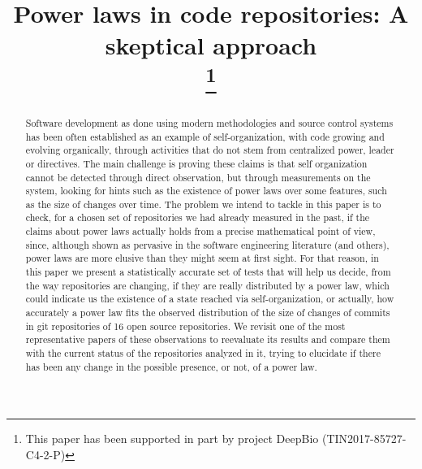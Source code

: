 \documentclass[conference]{IEEEtran}
\begin{document}
\title{Power laws in code repositories: A skeptical approach\\
  \thanks{This paper has been supported in part by project DeepBio
    (TIN2017-85727-C4-2-P)} }

\author{
   \and {}
   }

\maketitle

\begin{abstract}
  
  Software development as done using modern methodologies and source
  control systems has been often established as an example of
  self-organization, with code growing and evolving organically,
  through activities that do not stem from centralized power, leader
  or directives.  The main challenge is proving these claims is that
  self organization cannot be detected through direct observation, but
  through measurements on the system, looking for hints such as the
  existence of power laws over some features, such as the size of
  changes over time.  The problem we intend to tackle in this paper is
  to check, for a chosen set of repositories we had already measured
  in the past, if the claims about power laws actually holds from a
  precise mathematical point of view, since, although shown as
  pervasive in the software engineering literature (and others), power
  laws are more elusive than they might seem at first sight. For that
  reason, in this paper we present a statistically accurate set of
  tests that will help us decide, from the way repositories are
  changing, if they are really distributed by a power law, which could
  indicate us the existence of a state reached via self-organization,
  or actually, how accurately a power law fits the observed
  distribution of the size of changes of commits in git repositories
  of 16 open source repositories.  We revisit one of the most
  representative papers of these observations to reevaluate its
  results and compare them with the current status of the repositories
  analyzed in it, trying to elucidate if there has been any change in
  the possible presence, or not, of a power law.

\end{abstract}
\end{document}

